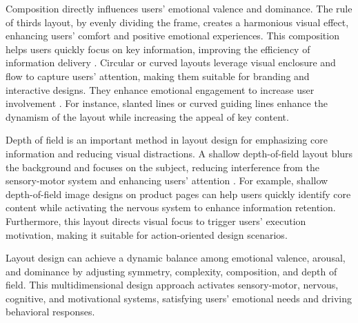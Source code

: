 Composition directly influences users’ emotional valence and dominance. The rule of thirds layout, by evenly dividing the frame, creates a harmonious visual effect, enhancing users’ comfort and positive emotional experiences. This composition helps users quickly focus on key information, improving the efficiency of information delivery \cite{mai2011rule}. Circular or curved layouts leverage visual enclosure and flow to capture users’ attention, making them suitable for branding and interactive designs. They enhance emotional engagement to increase user involvement \cite{resnick2003design}. For instance, slanted lines or curved guiding lines enhance the dynamism of the layout while increasing the appeal of key content.

Depth of field is an important method in layout design for emphasizing core information and reducing visual distractions. A shallow depth-of-field layout blurs the background and focuses on the subject, reducing interference from the sensory-motor system and enhancing users’ attention \cite{datta2006studying}. For example, shallow depth-of-field image designs on product pages can help users quickly identify core content while activating the nervous system to enhance information retention. Furthermore, this layout directs visual focus to trigger users’ execution motivation, making it suitable for action-oriented design scenarios.

Layout design can achieve a dynamic balance among emotional valence, arousal, and dominance by adjusting symmetry, complexity, composition, and depth of field. This multidimensional design approach activates sensory-motor, nervous, cognitive, and motivational systems, satisfying users' emotional needs and driving behavioral responses.	

